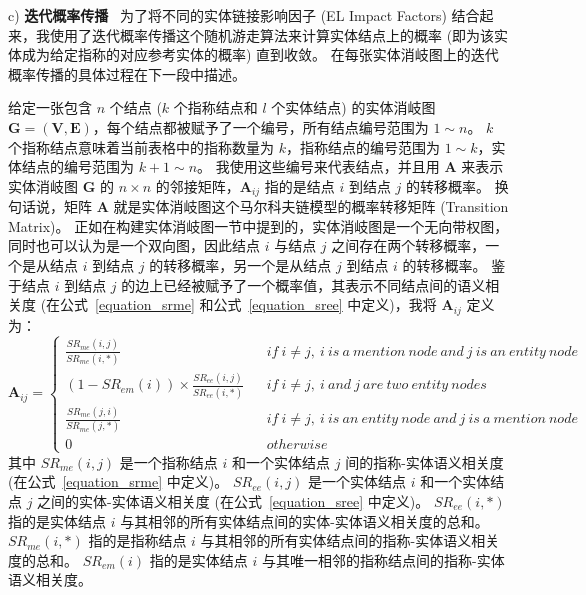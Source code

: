 c) \textbf{迭代概率传播} \ 
为了将不同的实体链接影响因子 (EL Impact Factors) 结合起来，我使用了迭代概率传播这个随机游走算法来计算实体结点上的概率 (即为该实体成为给定指称的对应参考实体的概率) 直到收敛。
在每张实体消岐图上的迭代概率传播的具体过程在下一段中描述。\par

给定一张包含 $n$ 个结点 ($k$ 个指称结点和 $l$ 个实体结点) 的实体消岐图 $\bm{G}=(\bm{V},\bm{E})$，每个结点都被赋予了一个编号，所有结点编号范围为 $1 \sim n$。
$k$ 个指称结点意味着当前表格中的指称数量为 $k$，指称结点的编号范围为 $1 \sim k$，实体结点的编号范围为 $k+1 \sim n$。
我使用这些编号来代表结点，并且用 $\bm{A}$ 来表示实体消岐图 $\bm{G}$ 的 $n \times n$ 的邻接矩阵，$\bm{A}_{ij}$ 指的是结点 $i$ 到结点 $j$ 的转移概率。
换句话说，矩阵 $\bm{A}$ 就是实体消岐图这个马尔科夫链模型的概率转移矩阵 (Transition Matrix)。
正如在构建实体消岐图一节中提到的，实体消岐图是一个无向带权图，同时也可以认为是一个双向图，因此结点 $i$ 与结点 $j$ 之间存在两个转移概率，一个是从结点 $i$ 到结点 $j$ 的转移概率，另一个是从结点 $j$ 到结点 $i$ 的转移概率。
鉴于结点 $i$ 到结点 $j$ 的边上已经被赋予了一个概率值，其表示不同结点间的语义相关度 (在公式~\ref{equation_srme} 和公式~\ref{equation_sree} 中定义)，我将 $\bm{A}_{ij}$ 定义为：
\begin{equation}
\bm{A}_{ij}=\left\{
\begin{array}{rcl}
\frac{SR_{me}(i,j)}{SR_{me}(i,*)} && {if \ i \neq j,\ i\ is\ a\ mention\ node\ and\ j\ is\ an\ entity\ node}\\
(1-SR_{em}(i)) \times \frac{SR_{ee}(i,j)}{SR_{ee}(i,*)} && {if\ i \neq j,\ i\ and\ j\ are\ two\ entity\ nodes}\\
\frac{SR_{me}(j,i)}{SR_{me}(j,*)} && {if \ i \neq j,\ i\ is\ an\ entity\ node\ and\ j\ is\ a\ mention\ node}\\
0 && {otherwise}
\end{array} \right.
\label{aij}
\end{equation}
其中 $SR_{me}(i, j)$ 是一个指称结点 $i$ 和一个实体结点 $j$ 间的指称-实体语义相关度 (在公式~\ref{equation_srme} 中定义)。
$SR_{ee}(i, j)$ 是一个实体结点 $i$ 和一个实体结点 $j$ 之间的实体-实体语义相关度 (在公式~\ref{equation_sree} 中定义)。
$SR_{ee}(i, \ast)$ 指的是实体结点 $i$ 与其相邻的所有实体结点间的实体-实体语义相关度的总和。
$SR_{me}(i, \ast)$ 指的是指称结点 $i$ 与其相邻的所有实体结点间的指称-实体语义相关度的总和。
$SR_{em}(i)$ 指的是实体结点 $i$ 与其唯一相邻的指称结点间的指称-实体语义相关度。\par


